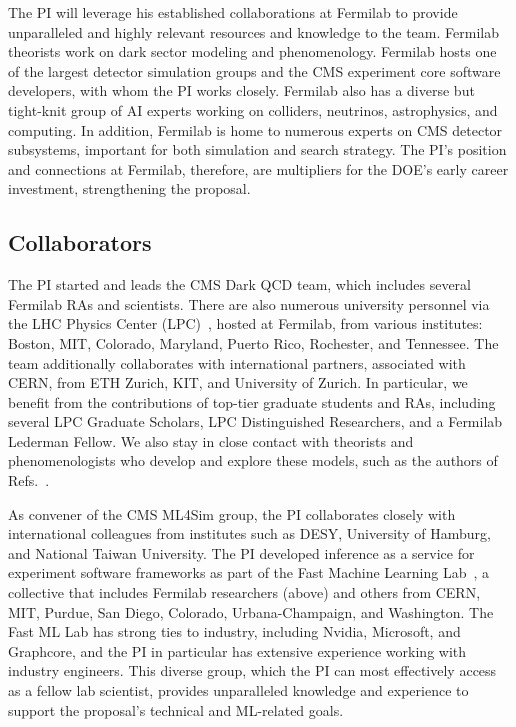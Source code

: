 The PI will leverage his established collaborations at Fermilab to provide unparalleled and highly relevant resources and knowledge to the team.
Fermilab theorists work on dark sector modeling and phenomenology.
Fermilab hosts one of the largest detector simulation groups and the CMS experiment core software developers, with whom the PI works closely.
Fermilab also has a diverse but tight-knit group of AI experts working on colliders, neutrinos, astrophysics, and computing.
In addition, Fermilab is home to numerous experts on CMS detector subsystems, important for both simulation and search strategy.
The PI's position and connections at Fermilab, therefore, are multipliers for the DOE's early career investment, strengthening the proposal.

\subsection{Collaborators}\label{subsec:collab}

The PI started and leads the CMS Dark QCD team, which includes several Fermilab RAs and scientists.
There are also numerous university personnel via the LHC Physics Center (LPC)~\cite{LPC}, hosted at Fermilab, from various institutes:
Boston, MIT, Colorado, Maryland, Puerto Rico, Rochester, and Tennessee.
The team additionally collaborates with international partners, associated with CERN, from ETH Zurich, KIT, and University of Zurich.
In particular, we benefit from the contributions of top-tier graduate students and RAs, including several LPC Graduate Scholars, LPC Distinguished Researchers, and a Fermilab Lederman Fellow.
We also stay in close contact with theorists and phenomenologists who develop and explore these models,
such as the authors of Refs.~\cite{Strassler:2006im,Cohen:2015toa,Schwaller:2015gea,Knapen:2016hky,Albouy:2022cin}.

As convener of the CMS ML4Sim group, the PI collaborates closely with international colleagues from institutes such as DESY, University of Hamburg, and National Taiwan University.
The PI developed inference as a service for experiment software frameworks as part of the Fast Machine Learning Lab~\cite{FML},
a collective that includes Fermilab researchers (above)
and others from CERN, MIT, Purdue, San Diego, Colorado, Urbana-Champaign, and Washington.
The Fast ML Lab has strong ties to industry, including Nvidia, Microsoft, and Graphcore, and the PI in particular has extensive experience working with industry engineers.
This diverse group, which the PI can most effectively access as a fellow lab scientist,
provides unparalleled knowledge and experience to support the proposal's technical and ML-related goals.
